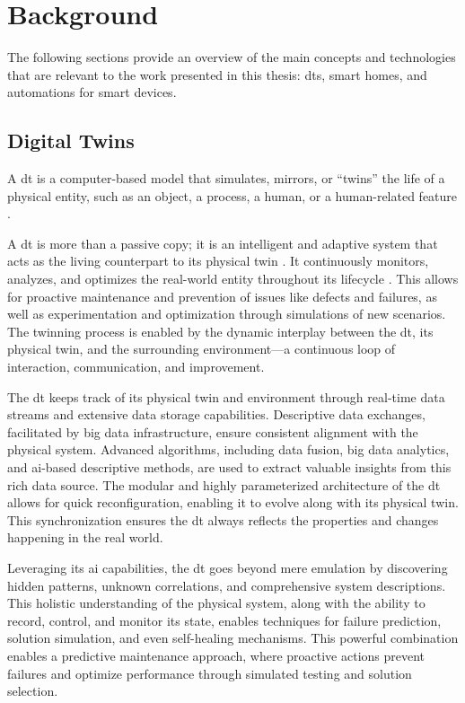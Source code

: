 \chapter{Background}\label{ch:background}

The following sections provide an overview of the main concepts and technologies that are relevant to the work presented in this thesis: \acrshort{dt}s, smart homes, and automations for smart devices.

\section{Digital Twins}

A \acrshort{dt} is a computer-based model that simulates, mirrors, or ``twins'' the life of a physical entity, such as an object, a process, a human, or a human-related feature \parencite{barricelliMultiModalApproachCreating2022}.

A \acrshort{dt} is more than a passive copy; it is an intelligent and adaptive system that acts as the living counterpart to its physical twin \parencite{grievesDigitalTwinManufacturing2014,kritzingerDigitalTwinManufacturing2018}. It continuously  monitors, analyzes, and optimizes the real-world entity throughout its lifecycle \parencite{negriReviewRolesDigital2017}. This allows for proactive maintenance and prevention of issues like defects and failures, as well as experimentation and optimization through simulations of new scenarios. The twinning process is enabled by the dynamic interplay between the \acrshort{dt}, its physical twin, and the surrounding environment---a continuous loop of interaction, communication, and improvement.

The \acrshort{dt} keeps track of its physical twin and environment through real-time data streams and extensive data storage capabilities. Descriptive data exchanges, facilitated by big data infrastructure, ensure consistent alignment with the physical system. Advanced algorithms, including data fusion, big data analytics, and \acrshort{ai}-based descriptive methods, are used to extract valuable insights from this rich data source. The modular and highly parameterized architecture of the \acrshort{dt} allows for quick reconfiguration, enabling it to evolve along with its physical twin. This synchronization ensures the \acrshort{dt} always reflects the properties and changes happening in the real world.

Leveraging its \acrshort{ai} capabilities, the \acrshort{dt} goes beyond mere emulation by discovering hidden patterns, unknown correlations, and comprehensive system descriptions. This holistic understanding of the physical system, along with the ability to record, control, and monitor its state, enables techniques for failure prediction, solution simulation, and even self-healing mechanisms. This powerful combination enables a predictive maintenance approach, where proactive actions prevent failures and optimize performance through simulated testing and solution selection.

